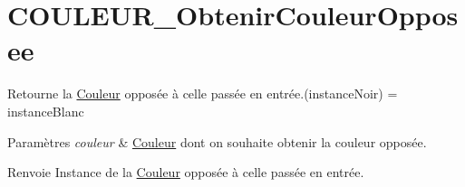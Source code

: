\hypertarget{COULEUR_ObtenirCouleurOpposee-example}{}\section{C\+O\+U\+L\+E\+U\+R\+\_\+\+Obtenir\+Couleur\+Opposee}
Retourne la \hyperlink{structCouleur}{Couleur} opposée à celle passée en entrée.(instance\+Noir) = instance\+Blanc


\begin{DoxyParams}{Paramètres}
{\em couleur} & \hyperlink{structCouleur}{Couleur} dont on souhaite obtenir la couleur opposée.\\
\hline
\end{DoxyParams}
\begin{DoxyReturn}{Renvoie}
Instance de la \hyperlink{structCouleur}{Couleur} opposée à celle passée en entrée.
\end{DoxyReturn}

\begin{DoxyCodeInclude}
\end{DoxyCodeInclude}
 